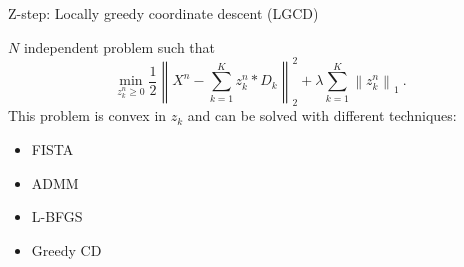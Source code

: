 \documentclass{beamer}
\def\keypoint#1{\hspace{0pt plus 1 filll}\textcolor{gray}{#1}}
\def\mycite#1{\keypoint{\small\citep{#1}}}
\begin{document}

\begin{frame}{Z-step: Locally greedy coordinate descent (LGCD)}

$N$ independent problem such that
\[
	\label{eq:sparse_code}
	\min_{z_k^n \ge 0} \frac{1}{2} \left\|X^n - \sum_{k=1}^K z_k^n * D_k\right\|_2^2
	+ \lambda\sum_{k=1}^K\left\|z_k^n\right\|_1~.
\]
This problem is convex in $z_k$ and can be solved with different techniques:
\begin{itemize}
	\item FISTA \mycite{Chalasani2013}
	\item ADMM \mycite{Bristow2013}
	\item L-BFGS \mycite{Jas2017}
	\item Greedy CD \mycite{Kavukcuoglu2010}
\end{itemize}


\end{frame}
\end{document}

